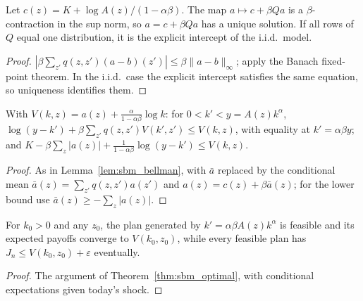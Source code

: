 \begin{lemma}
\label{lem:mbm_intercept}
\leanok
{}
Let $c(z)=K+\log A(z)/(1-\alpha\beta)$. The map $a\mapsto c+\beta Qa$ is a $\beta$-contraction in the sup norm, so
$a=c+\beta Qa$ has a unique solution. If all rows of $Q$ equal one distribution, it is the explicit intercept of the
i.i.d.\ model.
\end{lemma}
\begin{proof}
\leanok
$|\beta\sum_{z'}q(z,z')(a-b)(z')|\le\beta\|a-b\|_\infty$; apply the Banach fixed-point theorem. In the i.i.d.\ case the
explicit intercept satisfies the same equation, so uniqueness identifies them.
\end{proof}

\begin{lemma}
\label{lem:mbm_bellman}
\leanok
{}
With $V(k,z)=a(z)+\frac{\alpha}{1-\alpha\beta}\log k$: for $0<k'<y=A(z)k^\alpha$,
$\log(y-k')+\beta\sum_{z'}q(z,z')V(k',z')\le V(k,z)$, with equality at $k'=\alpha\beta y$; and
$K-\beta\sum_z|a(z)|+\frac1{1-\alpha\beta}\log(y-k')\le V(k,z)$.
\end{lemma}
\begin{proof}
\leanok
As in Lemma~\ref{lem:sbm_bellman}, with $\bar a$ replaced by the conditional mean $\bar a(z)=\sum_{z'}q(z,z')a(z')$
and $a(z)=c(z)+\beta\bar a(z)$; for the lower bound use $\bar a(z)\ge-\sum_z|a(z)|$.
\end{proof}

\begin{theorem}
\label{thm:mbm_optimal}
\leanok
{}
For $k_0>0$ and any $z_0$, the plan generated by $k'=\alpha\beta A(z)k^\alpha$ is feasible and its expected payoffs
converge to $V(k_0,z_0)$, while every feasible plan has $J_n\le V(k_0,z_0)+\varepsilon$ eventually.
\end{theorem}
\begin{proof}
\leanok
The argument of Theorem~\ref{thm:sbm_optimal}, with conditional expectations given today's shock.
\end{proof}


